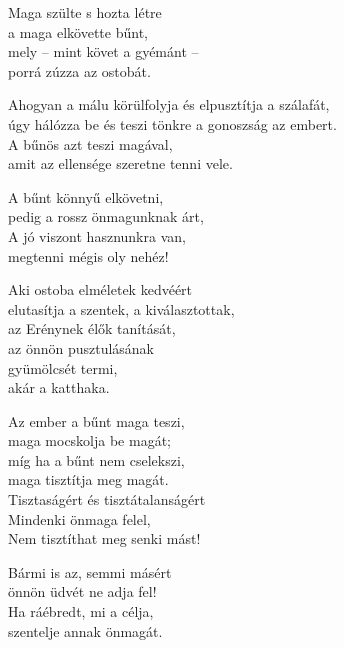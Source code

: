 \begin{dhpverse}

 Maga szülte s hozta létre\\
a maga elkövette bűnt,\\
mely – mint követ a gyémánt –\\
porrá zúzza az ostobát.

 Ahogyan a málu körülfolyja és elpusztítja a szálafát,\\
úgy hálózza be és teszi tönkre a gonoszság az embert.\\
A bűnös azt teszi magával,\\
amit az ellensége szeretne tenni vele.

 A bűnt könnyű elkövetni,\\
pedig a rossz önmagunknak árt,\\
A jó viszont hasznunkra van,\\
megtenni mégis oly nehéz!

 Aki ostoba elméletek kedvéért\\
elutasítja a szentek, a kiválasztottak,\\
az Erénynek élők tanítását,\\
az önnön pusztulásának\\
gyümölcsét termi,\\
akár a katthaka.

 Az ember a bűnt maga teszi,\\
maga mocskolja be magát;\\
míg ha a bűnt nem cselekszi,\\
maga tisztítja meg magát.\\
Tisztaságért és tisztátalanságért\\
Mindenki önmaga felel,\\
Nem tisztíthat meg senki mást!

\end{dhpverse}
\newpage
\begin{dhpverse}

 Bármi is az, semmi másért\\
önnön üdvét ne adja fel!\\
Ha ráébredt, mi a célja,\\
szentelje annak önmagát.

\end{dhpverse}
